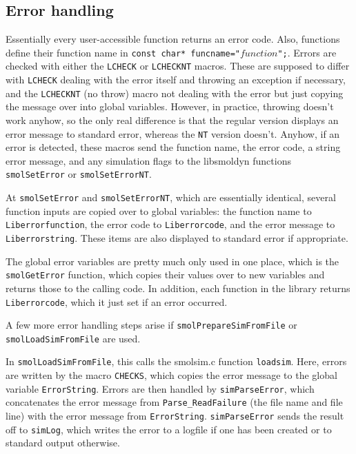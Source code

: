 \documentclass {scrbook}
\newcommand {\ttt} {\texttt}
\begin{document}
\subsection{Error handling}

Essentially every user-accessible function returns an error code. Also, functions define their function name in \ttt{const char* funcname="}$function$\ttt{";}. Errors are checked with either the \ttt{LCHECK} or \ttt{LCHECKNT} macros. These are supposed to differ with \ttt{LCHECK} dealing with the error itself and throwing an exception if necessary, and the \ttt{LCHECKNT} (no throw) macro not dealing with the error but just copying the message over into global variables. However, in practice, throwing doesn't work anyhow, so the only real difference is that the regular version displays an error message to standard error, whereas the \ttt{NT} version doesn't. Anyhow, if an error is detected, these macros send the function name, the error code, a string error message, and any simulation flags to the libsmoldyn functions \ttt{smolSetError} or \ttt{smolSetErrorNT}.

At \ttt{smolSetError} and \ttt{smolSetErrorNT}, which are essentially identical, several function inputs are copied over to global variables: the function name to \ttt{Liberrorfunction}, the error code to \ttt{Liberrorcode}, and the error message to \ttt{Liberrorstring}. These items are also displayed to standard error if appropriate.

The global error variables are pretty much only used in one place, which is the \ttt{smolGetError} function, which copies their values over to new variables and returns those to the calling code. In addition, each function in the library returns \ttt{Liberrorcode}, which it just set if an error occurred.

A few more error handling steps arise if \ttt{smolPrepareSimFromFile} or \ttt{smolLoadSimFromFile} are used.

In \ttt{smolLoadSimFromFile}, this calls the smolsim.c function \ttt{loadsim}. Here, errors are written by the macro \ttt{CHECKS}, which copies the error message to the global variable \ttt{ErrorString}. Errors are then handled by \ttt{simParseError}, which concatenates the error message from \ttt{Parse\_ReadFailure} (the file name and file line) with the error message from \ttt{ErrorString}. \ttt{simParseError} sends the result off to \ttt{simLog}, which writes the error to a logfile if one has been created or to standard output otherwise.
\end{document}
